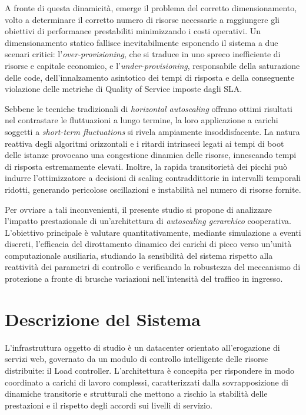 ﻿\documentclass[a4paper,12pt]{article}
\begin{document}
A fronte di questa dinamicità, emerge il problema del corretto dimensionamento, volto a determinare il corretto numero di risorse necessarie a raggiungere gli obiettivi di performance prestabiliti minimizzando i costi operativi. Un dimensionamento statico fallisce inevitabilmente esponendo il sistema a due scenari critici: l'\textit{over-provisioning}, che si traduce in uno spreco inefficiente di risorse e capitale economico, e l'\textit{under-provisioning}, responsabile della saturazione delle code, dell'innalzamento asintotico dei tempi di risposta e della conseguente violazione delle metriche di Quality of Service imposte dagli SLA.

Sebbene le tecniche tradizionali di \textit{horizontal autoscaling} offrano ottimi risultati nel contrastare le fluttuazioni a lungo termine, la loro applicazione a carichi soggetti a \textit{short-term fluctuations} si rivela ampiamente insoddisfacente. La natura reattiva degli algoritmi orizzontali e i ritardi intrinseci legati ai tempi di boot delle istanze provocano una congestione dinamica delle risorse, innescando tempi di risposta estremamente elevati. Inoltre, la rapida transitorietà dei picchi può indurre l'ottimizzatore a decisioni di scaling contraddittorie in intervalli temporali ridotti, generando pericolose oscillazioni e instabilità nel numero di risorse fornite.

Per ovviare a tali inconvenienti, il presente studio si propone di analizzare l'impatto prestazionale di un'architettura di \textit{autoscaling gerarchico} cooperativa. L'obiettivo principale è valutare quantitativamente, mediante simulazione a eventi discreti, l'efficacia del dirottamento dinamico dei carichi di picco verso un'unità computazionale ausiliaria, studiando la sensibilità del sistema rispetto alla reattività dei parametri di controllo e verificando la robustezza del meccanismo di protezione a fronte di brusche variazioni nell'intensità del traffico in ingresso.

\newpage


\section{Descrizione del Sistema}\label{sec:description}

L'infrastruttura oggetto di studio è un datacenter orientato all'erogazione di servizi web, governato da un modulo di controllo intelligente delle risorse distribuite: il Load controller. L'architettura è concepita per rispondere in modo coordinato a carichi di lavoro complessi, caratterizzati dalla sovrapposizione di dinamiche transitorie e strutturali che mettono a rischio la stabilità delle prestazioni e il rispetto degli accordi sui livelli di servizio.
\end{document}
